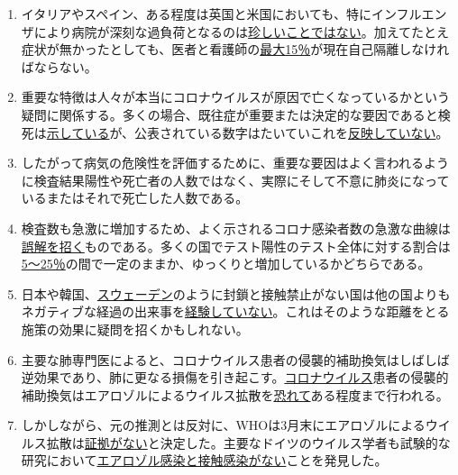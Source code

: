 \begin{enumerate}
\item
  イタリアやスペイン、ある程度は英国と米国においても、特にインフルエンザにより病院が深刻な過負荷となるのは\href{https://off-guardian.org/2020/04/02/coronavirus-fact-check-1-flu-doesnt-overwhelm-our-hospitals/}{珍しいことではない}。加えてたとえ症状が無かったとしても、医者と看護師の\href{https://www.reuters.com/article/us-health-coronavirus-spain-morgue-idUSKBN21B1PP}{最大15％}が現在自己隔離しなければならない。
\item
  重要な特徴は人々が本当にコロナウイルスが原因で亡くなっているかという疑問に関係する。多くの場合、既往症が重要または決定的な要因であると検死は\href{https://www.abendblatt.de/hamburg/article228828787/rechtsmedizin-pueschel-hamburg-corona-virus-infektion-covid-19-coronavirus-krise-patienten-krankenhaeuser-kliniken-infektionsrate-krankheit-pandemie-test-lungenkrankheit-sars-cov-epidemie-sars-cov-2.html}{示している}が、公表されている数字はたいていこれを\href{https://swprs.org/rki-relativiert-corona-todesfaelle/}{反映していない}。
\item
  したがって病気の危険性を評価するために、重要な要因はよく言われるように検査結果陽性や死亡者の人数ではなく、実際にそして不意に肺炎になっているまたはそれで死亡した人数である。
\item
  検査数も急激に増加するため、よく示されるコロナ感染者数の急激な曲線は\href{https://multipolar-magazin.de/artikel/coronavirus-regierung-ignoriert-daten}{誤解を招く}ものである。多くの国でテスト陽性のテスト全体に対する割合は\href{https://swprs.org/rate-of-positive-covid19-tests/}{5～25％}の間で一定のままか、ゆっくりと増加しているかどちらである。
\item
  日本や韓国、\href{https://www.telegraph.co.uk/news/2020/04/03/coronavirus-swedish-experiment-could-prove-britain-wrong/}{スウェーデン}のように封鎖と接触禁止がない国は他の国よりもネガティブな経過の出来事を\href{https://www.japantimes.co.jp/news/2020/03/20/national/coronavirus-explosion-expected-japan/}{経験していない}。これはそのような距離をとる施策の効果に疑問を招くかもしれない。
\item
  主要な肺専門医によると、コロナウイルス患者の侵襲的補助換気はしばしば逆効果であり、肺に更なる損傷を引き起こす。\href{http://d.hatena.ne.jp/keyword/\%A5\%B3\%A5\%ED\%A5\%CA\%A5\%A6\%A5\%A4\%A5\%EB\%A5\%B9}{コロナウイルス}患者の侵襲的補助換気はエアロゾルによるウイルス拡散を\href{https://archive.is/KX5IQ}{恐れて}ある程度まで行われる。
\item
  しかしながら、元の推測とは反対に、WHOは3月末にエアロゾルによるウイルス拡散は\href{https://www.who.int/news-room/commentaries/detail/modes-of-transmission-of-virus-causing-covid-19-implications-for-ipc-precaution-recommendations}{証拠がない}と決定した。主要なドイツのウイルス学者も試験的な研究において\href{https://www.zeit.de/wissen/gesundheit/2020-04/hendrik-streeck-covid-19-heinsberg-symptome-infektionsschutz-massnahmen-studie/komplettansicht}{エアロゾル感染と接触感染がない}ことを発見した。

\end{enumerate}
